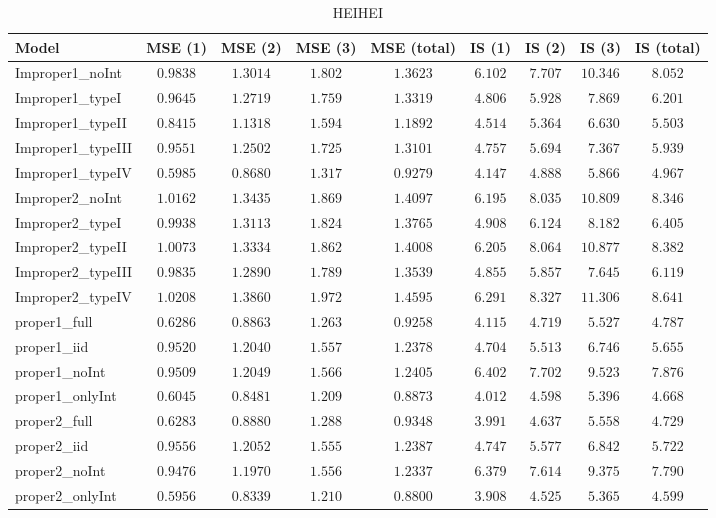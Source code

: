 \begin{table}

\caption{\label{tab:model-choice-sc10}HEIHEI}
\centering
\begin{tabular}{lcccccccc}
\hline
Model  & MSE (1) & MSE (2) & MSE (3) & MSE (total) & IS (1) & IS (2) & IS (3) & \multicolumn{1}{c}{IS (total)} \\ 
\hline
Improper1_noInt  & $0.9838$ & $1.3014$ & $1.802$ & $1.3623$ & $6.102$ & $7.707$ & $10.346$ & $8.052$ \\
Improper1_typeI  & $0.9645$ & $1.2719$ & $1.759$ & $1.3319$ & $4.806$ & $5.928$ & $\phantom{0}7.869$ & $6.201$ \\
Improper1_typeII  & $0.8415$ & $1.1318$ & $1.594$ & $1.1892$ & $4.514$ & $5.364$ & $\phantom{0}6.630$ & $5.503$ \\
Improper1_typeIII  & $0.9551$ & $1.2502$ & $1.725$ & $1.3101$ & $4.757$ & $5.694$ & $\phantom{0}7.367$ & $5.939$ \\
Improper1_typeIV  & $0.5985$ & $0.8680$ & $1.317$ & $0.9279$ & $4.147$ & $4.888$ & $\phantom{0}5.866$ & $4.967$ \\
Improper2_noInt  & $1.0162$ & $1.3435$ & $1.869$ & $1.4097$ & $6.195$ & $8.035$ & $10.809$ & $8.346$ \\
Improper2_typeI  & $0.9938$ & $1.3113$ & $1.824$ & $1.3765$ & $4.908$ & $6.124$ & $\phantom{0}8.182$ & $6.405$ \\
Improper2_typeII  & $1.0073$ & $1.3334$ & $1.862$ & $1.4008$ & $6.205$ & $8.064$ & $10.877$ & $8.382$ \\
Improper2_typeIII  & $0.9835$ & $1.2890$ & $1.789$ & $1.3539$ & $4.855$ & $5.857$ & $\phantom{0}7.645$ & $6.119$ \\
Improper2_typeIV  & $1.0208$ & $1.3860$ & $1.972$ & $1.4595$ & $6.291$ & $8.327$ & $11.306$ & $8.641$ \\
proper1_full  & $0.6286$ & $0.8863$ & $1.263$ & $0.9258$ & $4.115$ & $4.719$ & $\phantom{0}5.527$ & $4.787$ \\
proper1_iid  & $0.9520$ & $1.2040$ & $1.557$ & $1.2378$ & $4.704$ & $5.513$ & $\phantom{0}6.746$ & $5.655$ \\
proper1_noInt  & $0.9509$ & $1.2049$ & $1.566$ & $1.2405$ & $6.402$ & $7.702$ & $\phantom{0}9.523$ & $7.876$ \\
proper1_onlyInt  & $0.6045$ & $0.8481$ & $1.209$ & $0.8873$ & $4.012$ & $4.598$ & $\phantom{0}5.396$ & $4.668$ \\
proper2_full  & $0.6283$ & $0.8880$ & $1.288$ & $0.9348$ & $3.991$ & $4.637$ & $\phantom{0}5.558$ & $4.729$ \\
proper2_iid  & $0.9556$ & $1.2052$ & $1.555$ & $1.2387$ & $4.747$ & $5.577$ & $\phantom{0}6.842$ & $5.722$ \\
proper2_noInt  & $0.9476$ & $1.1970$ & $1.556$ & $1.2337$ & $6.379$ & $7.614$ & $\phantom{0}9.375$ & $7.790$ \\
proper2_onlyInt  & $0.5956$ & $0.8339$ & $1.210$ & $0.8800$ & $3.908$ & $4.525$ & $\phantom{0}5.365$ & $4.599$ \\
\hline 
\end{tabular}

\end{table}